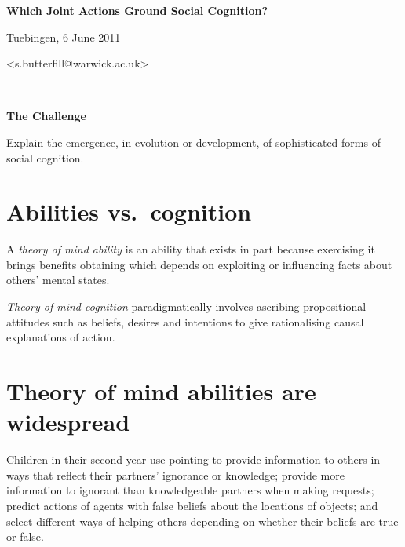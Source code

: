 \documentclass[11pt]{extarticle}
\date{}
\begin{document}
\begin{multicols}{3}

\setlength\footnotesep{1em}








\begin{center}
{\Large
\textbf{Which Joint Actions Ground Social Cognition?}
}

Tuebingen, 6 June 2011


<s.butterfill@warwick.ac.uk>

\end{center}



\

\begin{center}
{\Large
\textbf{The Challenge}
}
\end{center}

Explain the emergence, in evolution or development, of sophisticated forms of social cognition.



\section{Abilities vs.\ cognition}

A \emph{theory of mind ability} is an ability that exists in part because exercising it brings benefits obtaining which depends on exploiting or influencing facts about others’ mental states.  

\emph{Theory of mind cognition} paradigmatically involves ascribing propositional attitudes such as beliefs, desires and intentions to give rationalising causal explanations of action. 


\section{Theory of mind abilities are widespread}
Children in their second year use pointing to provide information to others\citep{Liszkowski:2006ec} in ways that reflect their partners’ ignorance or knowledge;\citep{Liszkowski:2008al} provide more information to ignorant than knowledgeable partners when making requests;\citep{ONeill:1996um}  predict actions of agents with false beliefs about the locations of objects;\citep{Onishi:2005hm,Southgate:2007js} and select different ways of helping others depending on whether their beliefs are true or false.\citep{Buttelmann:2009gy}


\end{multicols}
\end{document}
